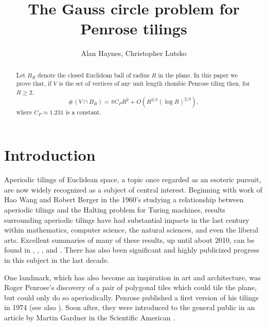 \documentclass[reqno]{amsart}
\begin{document}
	
	\title{The Gauss circle problem for Penrose tilings}
	
	\author{Alan Haynes, Christopher Lutsko}
	
	
	
	
	\begin{abstract}
	Let $B_R$ denote the closed Euclidean ball of radius $R$ in the plane. In this paper we prove that, if  $V$ is the set of vertices of any unit length rhombic Penrose tiling then, for $R\ge 2$,
	\[\#(V\cap B_R)=\pi C_P R^2 + O(R^{2/3}(\log R)^{2/3}),\]
	where $C_P\approx 1.231$ is a constant.
	\end{abstract}
	
	\maketitle
	
		
	
\section{Introduction}\label{sec.Intro}
Aperiodic tilings of Euclidean space, a topic once regarded as an esoteric pursuit, are now widely recognized as a subject of central interest. Beginning with work of Hao Wang and Robert Berger in the 1960's studying a relationship between aperiodic tilings and the Halting problem for Turing machines, results surrounding aperiodic tilings have had substantial impacts in the last century within mathematics, computer science, the natural sciences, and even the liberal arts. Excellent summaries of many of these results, up until about 2010, can be found in \cite[Chapter 1]{Gard1997}, \cite[Chapters 1, 2]{Sene1995}, \cite[Forward by Roger Penrose]{BaakGrim2013}, and \cite[Chapter 1]{BaakGrim2013}. There has also been significant and highly publicized progress in this subject in the last decade.

One landmark, which has also become an inspiration in art and architecture, was Roger Penrose's discovery of a pair of polygonal tiles which could tile the plane, but could only do so aperiodically. Penrose published a first version of his tilings in 1974 \cite{Penr1974} (see also \cite{Penr1979}). Soon after, they were introduced to the general public in an article by Martin Gardner in the Scientific American \cite{Gard1977}.
\end{document}
